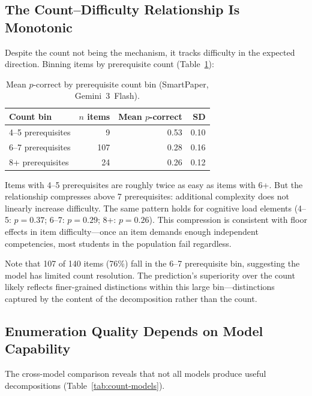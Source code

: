 \subsection{The Count--Difficulty Relationship Is Monotonic}\label{sec:calibration}

Despite the count not being the mechanism, it tracks difficulty in the expected direction. Binning items by prerequisite count (Table~\ref{tab:bins}):

\begin{table}[t]
\caption{Mean $p$-correct by prerequisite count bin (SmartPaper, Gemini~3~Flash).}\label{tab:bins}
\centering\footnotesize
\begin{tabular}{@{}lrrr@{}}
\toprule
Count bin & $n$ items & Mean $p$-correct & SD \\
\midrule
4--5 prerequisites & 9 & 0.53 & 0.10 \\
6--7 prerequisites & 107 & 0.28 & 0.16 \\
8+ prerequisites   & 24 & 0.26 & 0.12 \\
\bottomrule
\end{tabular}
\end{table}

Items with 4--5 prerequisites are roughly twice as easy as items with 6+. But the relationship compresses above 7 prerequisites: additional complexity does not linearly increase difficulty. The same pattern holds for cognitive load elements (4--5: $p = 0.37$; 6--7: $p = 0.29$; 8+: $p = 0.26$). This compression is consistent with floor effects in item difficulty---once an item demands enough independent competencies, most students in the population fail regardless.

Note that 107 of 140 items (76\%) fall in the 6--7 prerequisite bin, suggesting the model has limited count resolution. The prediction's superiority over the count likely reflects finer-grained distinctions within this large bin---distinctions captured by the content of the decomposition rather than the count.

\subsection{Enumeration Quality Depends on Model Capability}\label{sec:cross-model}

The cross-model comparison reveals that not all models produce useful decompositions (Table~\ref{tab:count-models}).

